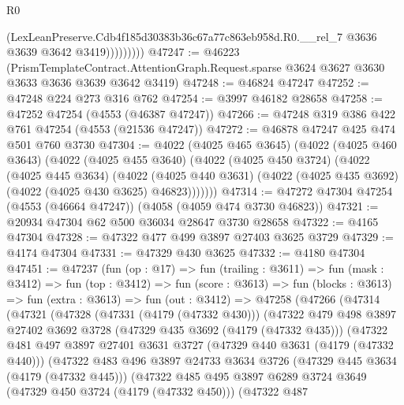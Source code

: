 \begin{lexlean}{R0}
\begin{coremodule}
                    (LexLeanPreserve.Cdb4f185d30383b36c67a77c863eb958d.R0.__rel_7
                      @3636
                      @3639
                      @3642
                      @3419)))))))))
@47247 := @46223
    (PrismTemplateContract.AttentionGraph.Request.sparse
      @3624
      @3627
      @3630
      @3633
      @3636
      @3639
      @3642
      @3419)
@47248 := @46824 @47247
@47252 := @47248 @224 @273 @316 @762
@47254 := @3997 @46182 @28658
@47258 := @47252 @47254 (@4553 (@46387 @47247))
@47266 := @47248 @319 @386 @422 @761 @47254 (@4553 (@21536 @47247))
@47272 := @46878 @47247 @425 @474 @501 @760 @3730
@47304 := @4022
    (@4025 @465 @3645)
    (@4022
      (@4025 @460 @3643)
      (@4022
        (@4025 @455 @3640)
        (@4022
          (@4025 @450 @3724)
          (@4022
            (@4025 @445 @3634)
            (@4022
              (@4025 @440 @3631)
              (@4022 (@4025 @435 @3692) (@4022 (@4025 @430 @3625) @46823)))))))
@47314 := @47272 @47304 @47254 (@4553 (@46664 @47247)) (@4058 (@4059 @474 @3730 @46823))
@47321 := @20934 @47304 @62 @500 @36034 @28647 @3730 @28658
@47322 := @4165 @47304
@47328 := @47322 @477 @499 @3897 @27403 @3625 @3729
@47329 := @4174 @47304
@47331 := @47329 @430 @3625
@47332 := @4180 @47304
@47451 := @47237
    (fun (op : @17) =>
    fun (trailing : @3611) =>
    fun (mask : @3412) =>
    fun (top : @3412) =>
    fun (score : @3613) =>
    fun (blocks : @3613) =>
    fun (extra : @3613) =>
    fun (out : @3412) =>
    @47258
      (@47266
        (@47314
          (@47321
            (@47328
              (@47331 (@4179 (@47332 @430)))
              (@47322
                @479
                @498
                @3897
                @27402
                @3692
                @3728
                (@47329 @435 @3692 (@4179 (@47332 @435)))
                (@47322
                  @481
                  @497
                  @3897
                  @27401
                  @3631
                  @3727
                  (@47329 @440 @3631 (@4179 (@47332 @440)))
                  (@47322
                    @483
                    @496
                    @3897
                    @24733
                    @3634
                    @3726
                    (@47329 @445 @3634 (@4179 (@47332 @445)))
                    (@47322
                      @485
                      @495
                      @3897
                      @6289
                      @3724
                      @3649
                      (@47329 @450 @3724 (@4179 (@47332 @450)))
                      (@47322
                        @487

\end{coremodule}
\end{lexlean}
